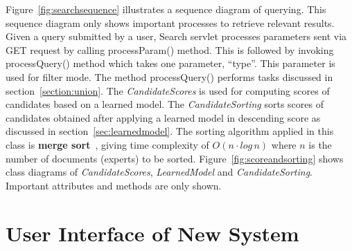 Figure~\ref{fig:searchsequence} illustrates a sequence diagram of querying. This sequence diagram only shows important processes to retrieve
relevant results. Given a query submitted by a user, Search servlet processes parameters sent via GET request by calling processParam() method. This is
followed by invoking processQuery() method which takes one parameter, ``type''. This parameter is used for filter mode. The method processQuery() 
performs tasks discussed in section~\ref{section:union}.
The \textit{CandidateScores} is used for computing scores of candidates based on a learned model. The \textit{CandidateSorting}
sorts scores of candidates obtained after applying a learned model in descending score as discussed in section~\ref{sec:learnedmodel}.
The sorting algorithm applied in this class is \textbf{merge sort}~\cite{mergesort}, giving time complexity of $O(n\cdot log\, n)$ where $n$ is the 
number of documents (experts) to be sorted.
Figure~\ref{fig:scoreandsorting} shows class diagrams of \textit{CandidateScores}, \textit{LearnedModel} and \textit{CandidateSorting}.
Important attributes and methods are only shown.


\section{User Interface of New System}

